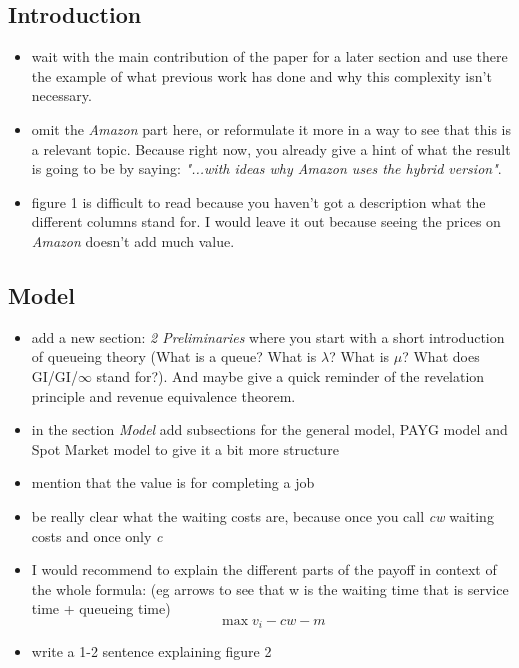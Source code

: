 \documentclass[]{article}
\begin{document}
\subsection{Introduction}
\begin{itemize}
\item wait with the main contribution of the paper for a later section and use there the example of what previous work has done and why this complexity isn't necessary.
\item omit the \emph{Amazon} part here, or reformulate it more in a way to see that this is a relevant topic. Because right now, you already give a hint of what the result is going to be by saying: \textit{"...with ideas why Amazon uses the hybrid version"}.  
\item figure 1 is difficult to read because you haven't got a description what the different columns stand for. I would leave it out because seeing the prices on \emph{Amazon} doesn't add much value.
\end{itemize}

\subsection{Model}
\begin{itemize}
	\item add a new section: \emph{2 Preliminaries} where you start with a short introduction of queueing theory (What is a queue? What is $\lambda$? What is $\mu$? What does GI/GI/$\infty$ stand for?). And maybe give a quick reminder of the revelation principle and revenue equivalence theorem.
	\item in the section \emph{Model} add subsections for the general model, PAYG model and Spot Market model to give it a bit more structure
	\item mention that the value is for completing a job
	\item be really clear what the waiting costs are, because once you call \textit{cw} waiting costs and once only \textit{c}
	\item I would recommend to explain the different parts of the payoff in context of the whole formula: (eg arrows to see  that w is the waiting time that is service time + queueing time)
	\begin{equation*}
	\max v_{i} - cw - m
	\end{equation*}
	\item write a 1-2 sentence explaining figure 2
\end{itemize}
\end{document}
